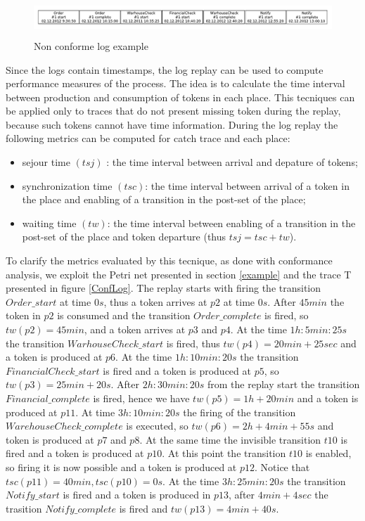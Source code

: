 \documentclass[11pt]{article}
\begin{document}
\begin{figure}[h]\label{NonConfLog}
\centering
\includegraphics[width=400pt,height=40pt]
{./items/logNonConforme.pdf}
\caption{Non conforme log example}
\end{figure}

Since the logs contain timestamps, the log replay can be used to compute performance measures of the process. The idea is to calculate the time interval between production and consumption of tokens in each place. This tecniques can be applied only to traces that do not present missing token during the replay, because such tokens cannot have time information. During the log replay the following metrics can be computed for catch trace and each place:
\begin{itemize}
\item sejour time $(tsj)$ : the time interval between arrival and depature of tokens;
\item synchronization time $(tsc)$: the time interval between arrival of a token in the place and enabling of a transition in the post-set of the place;
\item waiting time $(tw)$:  the time interval between enabling of a transition in the post-set of the place and token departure (thus $tsj=tsc+tw $).
\end{itemize}

To clarify the metrics evaluated by this tecnique, as done with conformance analysis, we exploit the Petri net  presented in section \ref{example} and the trace T presented in figure \ref{ConfLog}. The replay starts with firing the transition $Order\_start$ at time $0s$, thus a token arrives at $p2$ at time $0s$. After $45 min$ the token in $p2$ is consumed and the transition $Order\_complete$ is fired, so $tw(p2)=45min$, and a token arrives at $p3$ and $p4$. At the time $1h:5min:25s$ the transition $WarhouseCheck\_start$ is fired, thus $tw(p4)=20min+25sec$ and a token is produced at $p6$. At the time $1h:10min:20s$ the transition $FinancialCheck\_start$ is fired and a token is produced at $p5$, so $tw(p3)=25min+20s$. After $2h:30min:20s$ from the replay start the transition $Financial\_complete$ is fired, hence we have $tw(p5)=1h+20min$ and a token is produced at $p11$. At time $3h:10min:20s$ the firing of the transition $WarehouseCheck\_complete$ is executed, so $tw(p6)=2h+4min+55s$ and token is produced at $p7$ and $p8$. At the same time the invisible transition $t10$ is fired and a token is produced at $p10$. At this point the transition $t10$ is enabled, so firing it is now possible and a token is produced at $p12$. Notice that $tsc(p11)=40min, tsc(p10)=0s$. At the time $3h:25min:20s$ the transition $Notify\_start$ is fired and a token is produced in $p13$, after $4min+4sec$ the trasition $Notify\_complete$ is fired and $tw(p13) = 4min+40s$.
\end{document}
